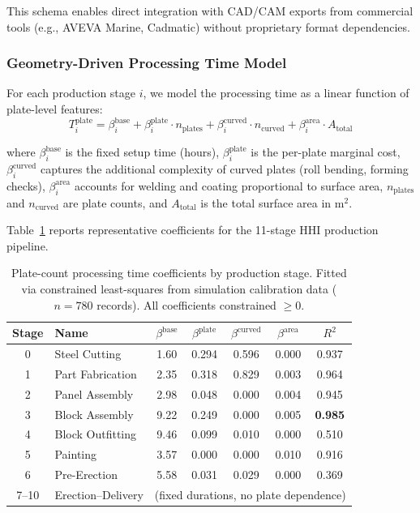 \documentclass[11pt,a4paper]{article}
\begin{document}
\noindent This schema enables direct integration with CAD/CAM exports from commercial tools (e.g., AVEVA Marine, Cadmatic) without proprietary format dependencies.

\subsubsection{Geometry-Driven Processing Time Model}

For each production stage $i$, we model the processing time as a linear function of plate-level features:
\begin{equation}
T_i^{\text{plate}} = \beta_i^{\text{base}} + \beta_i^{\text{plate}} \cdot n_{\text{plates}} + \beta_i^{\text{curved}} \cdot n_{\text{curved}} + \beta_i^{\text{area}} \cdot A_{\text{total}}
\label{eq:plate_time}
\end{equation}

\noindent where $\beta_i^{\text{base}}$ is the fixed setup time (hours), $\beta_i^{\text{plate}}$ is the per-plate marginal cost, $\beta_i^{\text{curved}}$ captures the additional complexity of curved plates (roll bending, forming checks), $\beta_i^{\text{area}}$ accounts for welding and coating proportional to surface area, $n_{\text{plates}}$ and $n_{\text{curved}}$ are plate counts, and $A_{\text{total}}$ is the total surface area in $\text{m}^2$.

Table~\ref{tab:plate_coefficients} reports representative coefficients for the 11-stage HHI production pipeline.

\begin{table}[h]
\centering
\caption{Plate-count processing time coefficients by production stage. Fitted via constrained least-squares from simulation calibration data ($n=780$ records). All coefficients constrained $\geq 0$.}
\label{tab:plate_coefficients}
\begin{tabular}{clccccc}
\toprule
Stage & Name & $\beta^{\text{base}}$ & $\beta^{\text{plate}}$ & $\beta^{\text{curved}}$ & $\beta^{\text{area}}$ & $R^2$ \\
\midrule
0 & Steel Cutting & 1.60 & 0.294 & 0.596 & 0.000 & 0.937 \\
1 & Part Fabrication & 2.35 & 0.318 & 0.829 & 0.003 & 0.964 \\
2 & Panel Assembly & 2.98 & 0.048 & 0.000 & 0.004 & 0.945 \\
3 & Block Assembly & 9.22 & 0.249 & 0.000 & 0.005 & \textbf{0.985} \\
4 & Block Outfitting & 9.46 & 0.099 & 0.010 & 0.000 & 0.510 \\
5 & Painting & 3.57 & 0.000 & 0.000 & 0.010 & 0.916 \\
6 & Pre-Erection & 5.58 & 0.031 & 0.029 & 0.000 & 0.369 \\
7--10 & Erection--Delivery & \multicolumn{5}{c}{(fixed durations, no plate dependence)} \\
\bottomrule
\end{tabular}
\end{table}
\end{document}

